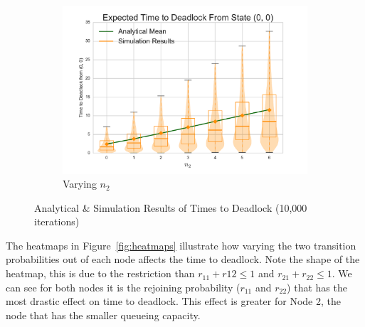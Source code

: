 \documentclass{article}
\begin{document}
\begin{figure}[H]
\begin{subfigure}[b]{0.5\textwidth}
  \includegraphics[width=\textwidth]{images/vary_n2fb}
  \caption{Varying $n_2$}
  \label{fig:timestodeadlockfb_n2}
\end{subfigure}
\caption{Analytical \& Simulation Results of Times to Deadlock (10,000 iterations)}
\label{fig:timestodeadlockfeedback}
\end{figure}

The heatmaps in Figure~\ref{fig:heatmaps} illustrate how varying the two transition probabilities out of each node affects the time to deadlock.
Note the shape of the heatmap, this is due to the restriction than $r_{11} + r{12} \leq 1$ and $r_{21} + r_{22} \leq 1$.
We can see for both nodes it is the rejoining probability ($r_{11}$ and $r_{22}$) that has the most drastic effect on time to deadlock.
This effect is greater for Node 2, the node that has the smaller queueing capacity.
\end{document}
